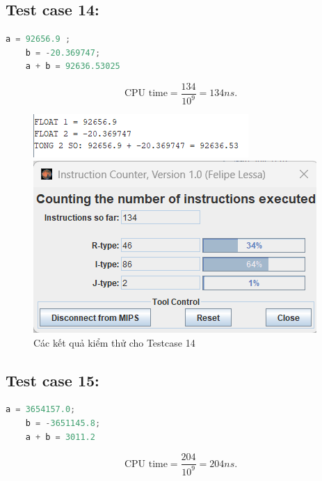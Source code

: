 \subsection{Test case 14:}
\begin{lstlisting}[language=Python]
    a = 92656.9 ;
    b = -20.369747;
    a + b = 92636.53025
\end{lstlisting}
\[
\text{CPU time} = \frac{\text{134}}{10^9} = 134 ns.
\]
\begin{figure}[!h]
    \centering
    \begin{minipage}[b]{0.48\textwidth}
        \centering
        \includegraphics[width=\textwidth]{image/TESTCASE/Testcase 14.png}
    \end{minipage}
    \hfill
    \begin{minipage}[b]{0.48\textwidth}
        \centering
        \includegraphics[width=\textwidth]{image/TESTCASE/Instruction Counter 14.png}
    \end{minipage}
    \vspace{0.5cm}
    \caption{Các kết quả kiểm thử cho Testcase 14}
\end{figure}

\vspace{0.5cm}

\subsection{Test case 15:}
\begin{lstlisting}[language=Python]
    a = 3654157.0;
    b = -3651145.8;
    a + b = 3011.2
\end{lstlisting}
\[
\text{CPU time} = \frac{\text{204}}{10^9} = 204ns.
\]

